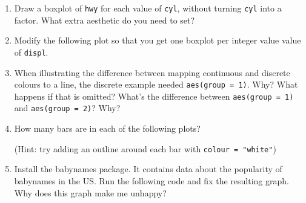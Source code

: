 \begin{enumerate}
\def\labelenumi{\arabic{enumi}.}
\item
  Draw a boxplot of \texttt{hwy} for each value of \texttt{cyl}, without
  turning \texttt{cyl} into a factor. What extra aesthetic do you need
  to set?
\item
  Modify the following plot so that you get one boxplot per integer
  value value of \texttt{displ}.

\begin{Shaded}
\begin{Highlighting}[]
\OperatorTok{+}\StringTok{ }
\StringTok{  }\NormalTok{()}
\end{Highlighting}
\end{Shaded}
\item
  When illustrating the difference between mapping continuous and
  discrete colours to a line, the discrete example needed
  \texttt{aes(group\ =\ 1)}. Why? What happens if that is omitted?
  What's the difference between \texttt{aes(group\ =\ 1)} and
  \texttt{aes(group\ =\ 2)}? Why?
\item
  How many bars are in each of the following plots?

\begin{Shaded}
\end{Shaded}

  (Hint: try adding an outline around each bar with
  \texttt{colour\ =\ "white"})
\item
  Install the babynames package. It contains data about the popularity
  of babynames in the US. Run the following code and fix the resulting
  graph. Why does this graph make me unhappy?


\end{enumerate}
